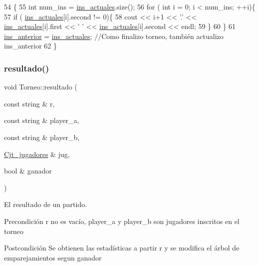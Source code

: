 \begin{DoxyCode}
54 \{
55   \textcolor{keywordtype}{int} num\_ins = \hyperlink{class_torneo_a2293acd2d9d04bdefc603ab4cdce2c5a}{ins\_actuales}.size();
56   \textcolor{keywordflow}{for} ( \textcolor{keywordtype}{int} i = 0; i < num\_ins; ++i)\{
57     \textcolor{keywordflow}{if} ( \hyperlink{class_torneo_a2293acd2d9d04bdefc603ab4cdce2c5a}{ins\_actuales}[i].second != 0)\{
58     cout << i+1 << \textcolor{charliteral}{'.'} << \hyperlink{class_torneo_a2293acd2d9d04bdefc603ab4cdce2c5a}{ins\_actuales}[i].first << \textcolor{charliteral}{' '} << 
      \hyperlink{class_torneo_a2293acd2d9d04bdefc603ab4cdce2c5a}{ins\_actuales}[i].second << endl;
59     \}
60   \}
61   \hyperlink{class_torneo_ad31e1a620a859ac6066eb6ca9de61e61}{ins\_anterior} = \hyperlink{class_torneo_a2293acd2d9d04bdefc603ab4cdce2c5a}{ins\_actuales}; \textcolor{comment}{//Como finalizo torneo, también actualizo
       ins\_anterior}
62 \}
\end{DoxyCode}
\mbox{\label{class_torneo_ad3d497cf4a6eafce2c36160f464bbe03}} 
\subsubsection{\texorpdfstring{resultado()}{resultado()}}
{\footnotesize\ttfamily void Torneo\+::resultado (\begin{DoxyParamCaption}\item[{const string \&}]{r,  }\item[{const string \&}]{player\+\_\+a,  }\item[{const string \&}]{player\+\_\+b,  }\item[{\hyperlink{class_cjt__jugadores}{Cjt\+\_\+jugadores} \&}]{jug,  }\item[{bool \&}]{ganador }\end{DoxyParamCaption})}



El resultado de un partido. 

\begin{DoxyPrecond}{Precondición}
r no es vacío, player\+\_\+a y player\+\_\+b son jugadores inscritos en el torneo 
\end{DoxyPrecond}
\begin{DoxyPostcond}{Postcondición}
Se obtienen las estadísticas a partir r y se modifica el árbol de emparejamientos segun ganador 
\end{DoxyPostcond}



